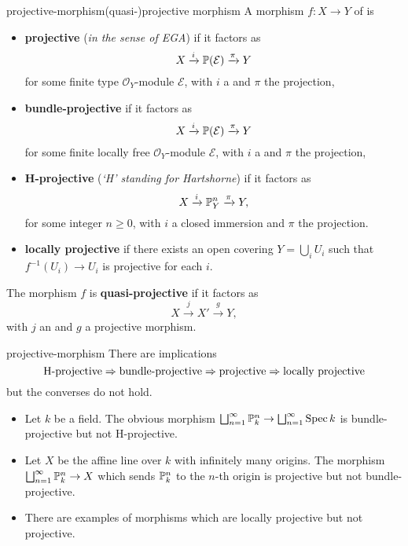 \begin{topic}{projective-morphism}{(quasi-)projective morphism}
    A morphism $f : X \to Y$ of  is
    \begin{itemize}
        \item \textbf{projective} (\textit{in the sense of EGA}) if it factors as
        \[ X \xrightarrow{i} \mathbb{P}(\mathcal{E}) \xrightarrow{\pi} Y \]
        for some  finite type $\mathcal{O}_Y$-module $\mathcal{E}$, with $i$ a  and $\pi$ the projection,
        \item \textbf{bundle-projective} if it factors as
        \[ X \xrightarrow{i} \mathbb{P}(\mathcal{E}) \xrightarrow{\pi} Y \]
        for some finite locally free $\mathcal{O}_Y$-module $\mathcal{E}$, with $i$ a  and $\pi$ the projection,
        \item \textbf{H-projective} (\textit{`H' standing for Hartshorne}) if it factors as
        \[ X \xrightarrow{i} \mathbb{P}^n_Y \xrightarrow{\pi} Y , \]
        for some integer $n \ge 0$, with $i$ a closed immersion and $\pi$ the projection.
        \item \textbf{locally projective} if there exists an open covering $Y = \bigcup_i U_i$ such that $f^{-1}(U_i) \to U_i$ is projective for each $i$.
    \end{itemize}
    The morphism $f$ is \textbf{quasi-projective} if it factors as
    \[ X \xrightarrow{j} X' \xrightarrow{g} Y , \]
    with $j$ an  and $g$ a projective morphism.
\end{topic}

\begin{example}{projective-morphism}
    There are implications
    \[ \textup{H-projective} \Rightarrow \textup{bundle-projective} \Rightarrow \textup{projective} \Rightarrow \textup{locally projective} \]
    but the converses do not hold.
    \begin{itemize}
        \item Let $k$ be a field. The obvious morphism $\bigsqcup_{n = 1}^{\infty} \mathbb{P}^n_k \to \bigsqcup_{n = 1}^{\infty} \operatorname{Spec} k$ is bundle-projective but not H-projective.
        \item Let $X$ be the affine line over $k$ with infinitely many origins. The morphism $\bigsqcup_{n = 1}^{\infty} \mathbb{P}^n_k \to X$ which sends $\mathbb{P}^n_k$ to the $n$-th origin is projective but not bundle-projective.
        \item There are examples of morphisms which are locally projective but not projective.
    \end{itemize}
\end{example}

